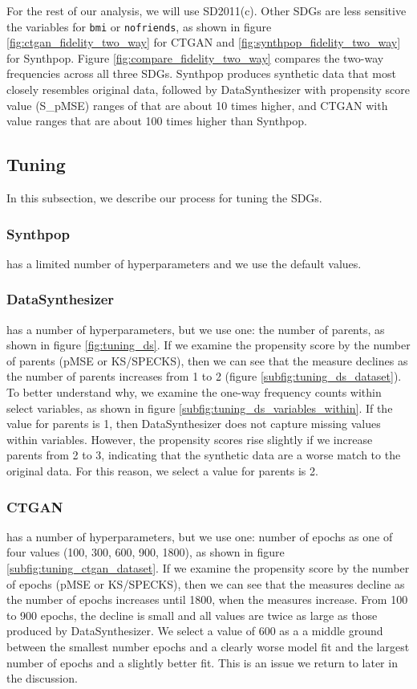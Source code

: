 \documentclass[runningheads]{llncs}
\begin{document}
For the rest of our analysis, we will use SD2011(c).  Other SDGs are less sensitive the variables for \texttt{bmi} or \texttt{nofriends}, as shown in figure \ref{fig:ctgan_fidelity_two_way} for CTGAN and \ref{fig:synthpop_fidelity_two_way} for Synthpop.  Figure \ref{fig:compare_fidelity_two_way} compares the two-way frequencies across all three SDGs.  Synthpop produces synthetic data that most closely resembles original data, followed by DataSynthesizer with propensity score value (S\_pMSE) ranges of that are about 10 times higher, and CTGAN with value ranges that are about 100 times higher than Synthpop.

\subsection{Tuning}

In this subsection, we describe our process for tuning the SDGs.  

\subsubsection{Synthpop} has a limited number of hyperparameters and we use the default values.  

\subsubsection{DataSynthesizer} has a number of hyperparameters, but we use one: the number of parents, as shown in figure \ref{fig:tuning_ds}.  If we examine the propensity score by the number of parents (pMSE or KS/SPECKS), then we can see that the measure declines as the number of parents increases from 1 to 2 (figure \ref{subfig:tuning_ds_dataset}).  To better understand why, we examine the one-way frequency counts within select variables, as shown in figure \ref{subfig:tuning_ds_variables_within}.  If the value for parents is 1, then DataSynthesizer does not capture missing values within variables.  However, the propensity scores rise slightly if we increase parents from 2 to 3, indicating that the synthetic data are a worse match to the original data.  For this reason, we select a value for parents is 2.

\subsubsection{CTGAN} has a number of hyperparameters, but we use one: number of epochs as one of four values (100, 300, 600, 900, 1800), as shown in figure \ref{subfig:tuning_ctgan_dataset}.  If we examine the propensity score by the number of epochs (pMSE or KS/SPECKS), then we can see that the measures decline as the number of epochs increases until 1800, when the measures increase.  From 100 to 900 epochs, the decline is small and all values are twice as large as those produced by DataSynthesizer.  We select a value of 600 as a a middle ground between the smallest number epochs and a clearly worse model fit and the largest number of epochs and a slightly better fit.  This is an issue we return to later in the discussion.  
\end{document}
